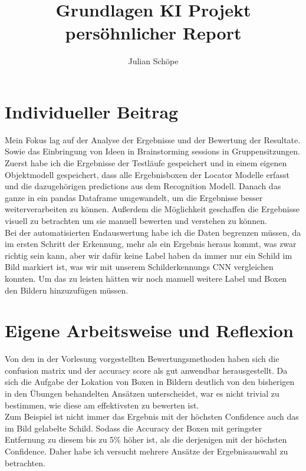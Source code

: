 \documentclass[runningheads]{llncs}
\begin{document}
%
\title{Grundlagen KI Projekt persöhnlicher Report}
%
%
\author {Julian Sch\"{o}pe}
%
%
%
\maketitle              %
%

%
%
\section{Individueller Beitrag}
Mein Fokus lag auf der Analyse der Ergebnisse und der Bewertung der Resultate. Sowie das Einbringung von Ideen in Brainstorming sessions in Gruppensitzungen.
\\
Zuerst habe ich die Ergebnisse der Testläufe gespeichert und in einem eigenen Objektmodell gespeichert, dass alle Ergebnisboxen der Locator Modelle erfasst und die dazugehörigen predictions aus dem Recognition Modell. Danach das ganze in ein pandas Dataframe umgewandelt, um die Ergebnisse besser weiterverarbeiten zu können. Außerdem die Möglichkeit geschaffen die Ergebnisse visuell zu betrachten um sie manuell bewerten und verstehen zu können. 
\\
Bei der automatisierten Endauswertung habe ich die Daten begrenzen müssen, da im ersten Schritt der Erkennung, mehr als ein Ergebnis heraus kommt, was zwar richtig sein kann, aber wir dafür keine Label haben da immer nur ein Schild im Bild markiert ist, was wir mit unserem Schilderkennungs CNN vergleichen konnten. Um das zu leisten hätten wir noch manuell weitere Label und Boxen den Bildern hinzuzufügen müssen.

\section{Eigene Arbeitsweise und Reflexion}
Von den in der Vorlesung vorgestellten Bewertungsmethoden haben sich die confusion matrix und der accuracy score als gut anwendbar herausgestellt. Da sich die Aufgabe der Lokation von Boxen in Bildern deutlich von den bisherigen in den Übungen behandelten Ansätzen unterscheidet, war es nicht trivial zu bestimmen, wie diese am effektivsten zu bewerten ist. 
\\
Zum Beispiel ist nicht immer das Ergebnis mit der höchsten Confidence auch das im Bild gelabelte Schild. Sodass die Accuracy der Boxen mit geringster Entfernung zu diesem bis zu 5\% höher ist, als die derjenigen mit der höchsten Confidence. Daher habe ich versucht mehrere Ansätze der Ergebnisauswahl zu betrachten.
\end{document}

